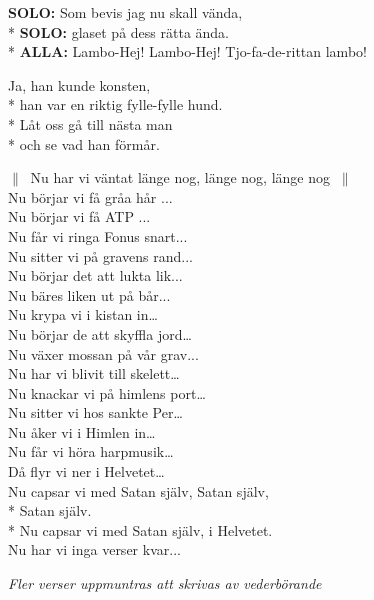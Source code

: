 \begin{SongText}[Lambo]
\begin{SongVerse}
        \textbf{SOLO:} Som bevis jag nu skall vända,\\*%
        \textbf{SOLO:} glaset på dess rätta ända.\\*%
        \textbf{ALLA:} Lambo-Hej! Lambo-Hej! Tjo-fa-de-rittan lambo!
    \end{SongVerse}
    \begin{SongVerse}
        Ja, han kunde konsten,\\*%
        han var en riktig fylle-fylle hund.\\*%
        Låt oss gå till nästa man\\*%
        och se vad han förmår.
    \end{SongVerse}
\end{SongText}
\begin{SongText}
    \begin{SongVerse}
        $\|\:$ Nu har vi väntat länge nog, länge nog, länge nog $\:\|$\\%
        Nu börjar vi få gråa hår ...\\%
        Nu börjar vi få ATP ...\\%
        Nu får vi ringa Fonus snart...\\%
        Nu sitter vi på gravens rand...\\%
        Nu börjar det att lukta lik...\\%
        Nu bäres liken ut på bår...\\%
        Nu krypa vi i kistan in…\\%
        Nu börjar de att skyffla jord…\\%
        Nu växer mossan på vår grav...\\%
        Nu har vi blivit till skelett…\\%
        Nu knackar vi på himlens port…\\%
        Nu sitter vi hos sankte Per…\\%
        Nu åker vi i Himlen in…\\%
        Nu får vi höra harpmusik…\\%
        Då flyr vi ner i Helvetet…\\%
        Nu capsar vi med Satan själv, Satan själv,\\*%
        Satan själv.\\*%
        Nu capsar vi med Satan själv, i Helvetet.\\%
        Nu har vi inga verser kvar...
    \end{SongVerse}
    \begin{SongVerse}
        \textit{Fler verser uppmuntras att skrivas av vederbörande}
        \hrulefill%


\end{SongVerse}
\end{SongText}
